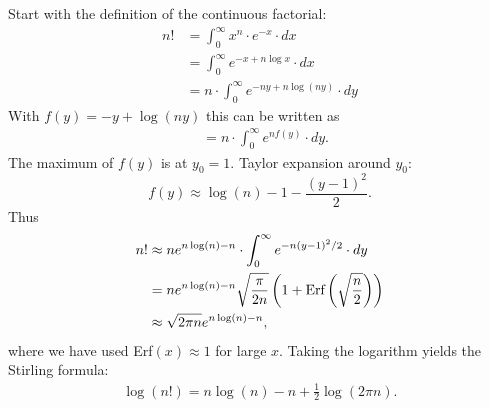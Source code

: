 Start with the definition of the continuous factorial:
\begin{align}
    n!
    &=\int_0^\infty x^n\cdot e^{-x}\cdot dx \\
    &=\int_0^\infty e^{-x+n\log x}\cdot dx \\
    &=n\cdot\int_0^\infty e^{-ny+n\log(ny)}\cdot dy
\end{align}
With $f(y)=-y+\log(ny)$ this can be written as
\begin{align}
    &=n\cdot\int_0^\infty e^{nf(y)}\cdot dy.
\end{align}
The maximum of $f(y)$ is at $y_0=1$. Taylor expansion 
around $y_0$:
\begin{equation}
    f(y)\approx\log(n)-1-\frac{(y-1)^2}{2}.
\end{equation}
Thus
\begin{align}
	n!
    &\approx n e^{n\log(n) -n} \cdot\int_0^\infty e^{-n(y-1)^2/2}\cdot dy \notag \\
    &= n e^{n\log(n) -n} \sqrt{\frac{\pi}{2n}}\left(1 + \text{Erf}\left(\sqrt{\frac{n}{2}}\right)\right) \notag \\
    &\approx  \sqrt{2 \pi n} e^{n\log(n) -n} ,
\end{align}
where we have used Erf$(x) \approx 1$ for large $x$. Taking the logarithm yields the Stirling formula:
\begin{align}
    \log(n!) = n \log(n) - n + \frac{1}{2} \log(2\pi n).
\end{align}